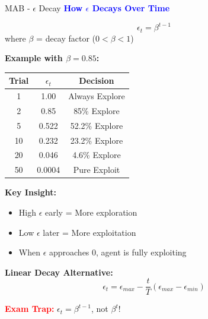 \documentclass[8pt]{beamer}
\begin{document}
\begin{frame}{MAB - $\epsilon$ Decay}
\fontsize{6.5}{7.5}\selectfont
\textcolor{blue}{\textbf{How $\epsilon$ Decays Over Time}}

\[
\epsilon_t = \beta^{t-1}
\]
where $\beta$ = decay factor ($0 < \beta < 1$)

\textbf{Example with $\beta = 0.85$:}

\begin{tabular}{|c|c|c|}
\hline
Trial & $\epsilon_t$ & Decision \\
\hline
1 & 1.00 & Always Explore \\
\hline
2 & 0.85 & 85\% Explore \\
\hline
5 & 0.522 & 52.2\% Explore \\
\hline
10 & 0.232 & 23.2\% Explore \\
\hline
20 & 0.046 & 4.6\% Explore \\
\hline
50 & 0.0004 & Pure Exploit \\
\hline
\end{tabular}

\textbf{Key Insight:}
\begin{itemize}
\item High $\epsilon$ early = More exploration
\item Low $\epsilon$ later = More exploitation
\item When $\epsilon$ approaches 0, agent is fully exploiting
\end{itemize}

\textbf{Linear Decay Alternative:}
\[
\epsilon_t = \epsilon_{max} - \frac{t}{T}(\epsilon_{max} - \epsilon_{min})
\]

\textcolor{red}{\textbf{Exam Trap:}} $\epsilon_t = \beta^{t-1}$, not $\beta^t$!
\end{frame}
\end{document}
